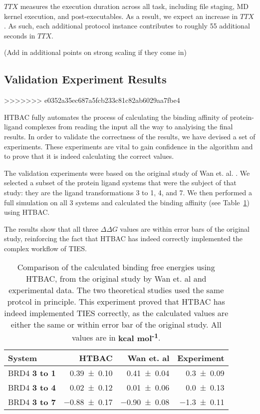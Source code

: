  \(TTX\) measures the execution duration across all task, including file staging, MD kernel execution, 
 and post-executables. As a result, we expect an increase in \(TTX\). As such, each additional 
 protocol instance contributes to roughly 55 additional seconds in \(TTX\). 

 (Add in additional points on strong scaling if they come in)


\subsection{Validation Experiment Results}
>>>>>>> e0352a35ec687a5fcb233c81c82ab6029aa7fbe4

HTBAC fully automates the process of calculating the binding affinity of
protein-ligand complexes from reading the input all the way to analyising the
final results. In order to validate the correctness of the results, we have
devised a set of experiments. These experiments are vital to gain confidence
in the algorithm and to prove that it is indeed calculating the correct values.

The validation experiments were based on the original study of Wan et. al.
\cite{Wan2017brd4}. We selected a subset of the protein ligand systems that
were the subject of that study: they are the ligand transformations 3 to 1, 4,
and 7. We then performed a full simulation on all 3 systems and calculated the
binding affinity (see Table~\ref{tab:exp2}) using HTBAC.

The results show that all three $\Delta \Delta G$ values are within error bars
of the original study, reinforcing the fact that HTBAC has indeed correctly
implemented the complex workflow of TIES.

\begin{table}
  \centering
  \begin{tabular}{l@{\hskip 1in}r@{\hskip 0.2in}r@{\hskip 0.2in}r}
    \toprule
    System & HTBAC & Wan et. al & Experiment \\
    \midrule
    BRD4 \textbf{3 to 1} & \num{0.39 +- 0.10} &   \num{0.41 +- 0.04} &  \num{0.3 +- 0.09} \\
    BRD4 \textbf{3 to 4} & \num{0.02 +- 0.12} &   \num{0.01 +- 0.06} &  \num{0.0 +- 0.13} \\
    BRD4 \textbf{3 to 7} & \num{-0.88 +- 0.17} &  \num{-0.90 +- 0.08} & \num{-1.3 +- 0.11} \\
    \bottomrule
  \end{tabular}

  \caption{Comparison of the calculated binding free energies using HTBAC, from
  the original study by Wan et. al and experimental data. The two theoretical
  studies used the same protcol in principle. This experiment proved that HTBAC
  has indeed implemented TIES correctly, as the calculated values are either
  the same or within error bar of the original study. All values are in
  \textbf{kcal mol\textsuperscript{-1}}.}
  \label{tab:exp2}


\end{table}

